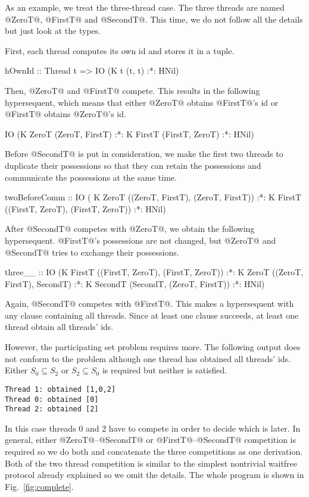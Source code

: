 As an example, we treat the three-thread case.  The three threads are
named @ZeroT@, @FirstT@ and @SecondT@.
This time, we do not follow all the details but just look at the types.

First, each thread computes its own id and stores it in a tuple.
\begin{spec}
hOwnId :: Thread t => IO (K t (t, t) :*: HNil)
\end{spec}
Then, @ZeroT@ and @FirstT@ compete.  This results in the
following hypersequent, which means that either @ZeroT@ obtains
@FirstT@'s id or @FirstT@ obtains @ZeroT@'s id.
\begin{spec}
IO (K ZeroT (ZeroT, FirstT) :*:
    K FirstT (FirstT, ZeroT) :*: HNil)
\end{spec}

Before @SecondT@ is put in consideration, we make the first two threads
to duplicate their possessions so that they can retain the possessions
and communicate the possessions at the same time.
\begin{spec}
twoBeforeComm :: IO (
                        K ZeroT ((ZeroT, FirstT), (ZeroT, FirstT)) :*:
                        K FirstT ((FirstT, ZeroT), (FirstT, ZeroT)) :*:
                        HNil)
\end{spec}

After @SecondT@ competes with @ZeroT@, we obtain the following
hypersequent.  @FirstT@'s possessions are not changed, but @ZeroT@ and
@SecondT@ tries to exchange their possessions.
\begin{spec}
three__ :: IO
  (K FirstT ((FirstT, ZeroT), (FirstT, ZeroT)) :*:
   K ZeroT ((ZeroT, FirstT), SecondT) :*:
   K SecondT (SecondT, (ZeroT, FirstT)) :*: HNil)
\end{spec}
Again, @SecondT@ competes with @FirstT@.  This makes a hypersequent with
any clause containing all threads.  Since at least one clause succeeds,
at least one thread obtain all threads' ids.

However, the participating set problem requires more.  The following
output does not conform to the problem although one thread has obtained
all threads' ids.  Either $S_0 \subseteq S_2$ or $S_2\subseteq S_0$ is
required but neither is satisfied.
\begin{verbatim}
Thread 1: obtained [1,0,2]
Thread 0: obtained [0]
Thread 2: obtained [2]
\end{verbatim}
In this case threads 0 and 2 have to compete in order to decide which
is later.  In general, either @ZeroT@--@SecondT@ or
@FirstT@--@SecondT@ competition is required so we do both and
concatenate the three competitions as one derivation.
Both of the two thread competition is similar to the simplest nontrivial
waitfree protocol already explained so we omit the details.  The whole
program is shown in Fig.~\ref{fig:complete}.


